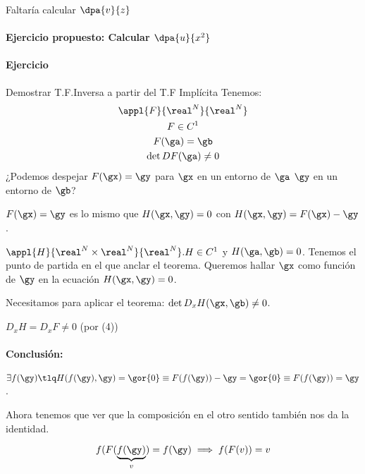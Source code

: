 Faltaría  calcular $\dpa{v}{z}$

\paragraph{Ejercicio propuesto: Calcular $\dpa{u}{x^2}$}

\paragraph{Ejercicio} Demostrar T.F.Inversa a partir del T.F Implícita
Tenemos:
\begin{gather}
 \appl{F}{\real^N}{\real^N}\\
 F\in C^1\\
 F(\ga) = \gb\\
 \det DF(\ga) \neq 0
\end{gather}
¿Podemos despejar $F(\gx) = \gy$ para $\gx$ en un entorno de $\ga$ $\gy$ en un entorno de $\gb$?

$F(\gx) = \gy$ es lo mismo que $H(\gx,\gy) = 0$ con $H(\gx,\gy) = F(\gx)-\gy$.

$\appl{H}{\real^N\times \real^N}{\real^N}. H\in C^1$ y $H(\ga,\gb) = 0$. Tenemos el punto de partida en el que anclar el teorema. Queremos hallar $\gx$ como función de $\gy$ en la ecuación $H(\gx,\gy) = 0$.

Necesitamos para aplicar el teorema: $\det D_x H(\gx,\gb) \neq 0$.

\obs $D_x H  = D_x F \neq 0$ (por (4))

\paragraph{Conclusión:} $\exists f(\gy) \tlq H(f(\gy),\gy) = \gor{0} \equiv F(f(\gy)) - \gy = \gor{0} \equiv F(f(\gy)) = \gy$.

Ahora tenemos que ver que la composición en el otro sentido también nos da la identidad.

\[f(F(\underbrace{f(\gy)}_{v}) = f(\gy) \implies f(F(v)) = v\]
\newpage